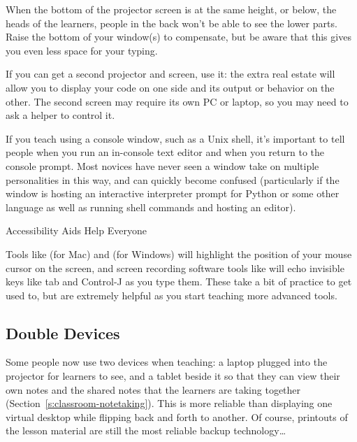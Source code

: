 When the bottom of the projector screen is at the same height, or below,
the heads of the learners, people in the back won't be able to see the
lower parts. Raise the bottom of your window(s) to compensate, but be
aware that this gives you even less space for your typing.

If you can get a second projector and screen, use it: the extra real
estate will allow you to display your code on one side and its output or
behavior on the other. The second screen may require its own PC or
laptop, so you may need to ask a helper to control it.

If you teach using a console window, such as a Unix shell, it's
important to tell people when you run an in-console text editor and when
you return to the console prompt. Most novices have never seen a window
take on multiple personalities in this way, and can quickly become
confused (particularly if the window is hosting an interactive
interpreter prompt for Python or some other language as well as running
shell commands and hosting an editor).

\begin{aside}{Accessibility Aids Help Everyone}

Tools like  (for Mac) and
 (for Windows) will highlight the
position of your mouse cursor on the screen, and screen recording
software tools like  will echo invisible keys
like tab and Control-J as you type them. These take a bit of
practice to get used to, but are extremely helpful as you start
teaching more advanced tools.

\end{aside}

\subsection*{Double Devices}

Some people now use two devices when teaching: a laptop plugged into the
projector for learners to see, and a tablet beside it so that they can
view their own notes and the shared notes that the learners are taking
together (Section~\ref{s:classroom-notetaking}). This is more reliable
than displaying one virtual desktop while flipping back and forth to
another. Of course, printouts of the lesson material are still the most
reliable backup technology{\ldots}

